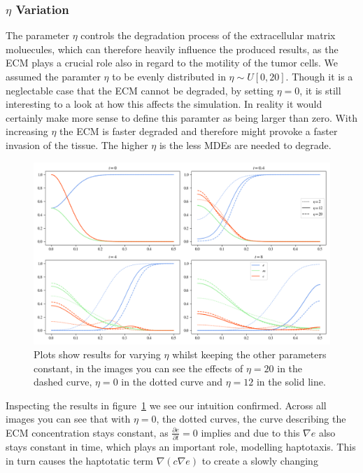 \subsubsection*{$\eta$ Variation}
The parameter $\eta$ controls the degradation process of the extracellular matrix moluecules, which can therefore heavily influence the produced results, as the ECM plays a crucial role also in regard to the motility of the tumor cells. We assumed the paramter $\eta$ to be evenly distributed in $\eta \sim U[0, 20]$. Though it is a neglectable case that the ECM cannot be degraded, by setting $\eta=0$, it is still interesting to a look at how this affects the simulation. In reality it would certainly make more sense to define this paramter as being larger than zero. \newline 
With increasing $\eta$ the ECM is faster degraded and therefore might provoke a faster invasion of the tissue. The higher $\eta$ is the less MDEs are needed to degrade.\newline
\begin{figure}[h]
    \centering
    \includegraphics[width=\textwidth]{resources/images/eta_variation.png}
    \caption{Plots show results for varying $\eta$ whilst keeping the other parameters constant, in the images you can see the effects of $\eta=20$ in the dashed curve, $\eta=0$ in the dotted curve and $\eta=12$ in the solid line.}
    \label{fig:eta_variation}
\end{figure}
Inspecting the results in figure~\ref{fig:eta_variation} we see our intuition confirmed. Across all images you can see that with $\eta=0$, the dotted curves, the curve describing the ECM concentration stays constant, as $\frac{\partial e}{\partial t} = 0$ implies and due to this $\nabla e$ also stays constant in time, which plays an important role, modelling haptotaxis. This in turn causes the haptotatic term $\nabla ( c \nabla e)$ to create a slowly changing 

